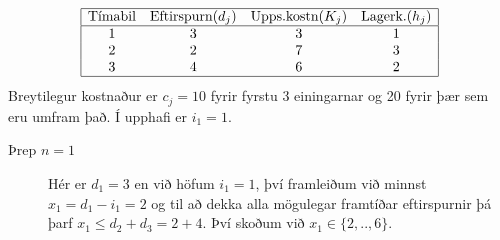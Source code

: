 \begin{daemi}[Birgðastýring]
  \[\begin{array}{|cccc|}\hline
    \mbox{Tímabil} & \mbox{Eftirspurn} (d_j) & \mbox{Upps.kostn} (K_j) & \mbox{Lagerk.} (h_j) \\\hline
1 & 3 & 3 & 1 \\
2 & 2 & 7 & 3 \\
3 & 4 & 6 & 2 \\ \hline
  \end{array}\]
Breytilegur kostnaður er $c_j=10$ fyrir fyrstu 3 einingarnar og 20 fyrir þær sem eru umfram það. Í upphafi er $i_1=1$.
\end{daemi}
\newpage
\begin{lausnSYND}\hspace{.1cm}
\begin{description}
  \item[Þrep $n=1$] Hér er $d_1=3$ en við höfum $i_1=1$, því framleiðum við minnst $x_1=d_1-i_1=2$ og til að dekka alla mögulegar framtíðar eftirspurnir þá þarf $x_1\leq d_2+d_3=2+4$. Því skoðum við $x_1\in\{2,..,6\}$.


\end{description}
\end{lausnSYND}
